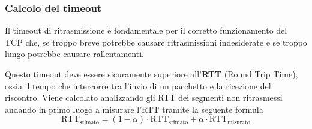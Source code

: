 \subsubsection{Calcolo del timeout}
Il timeout di ritrasmissione è fondamentale per il corretto funzionamento del TCP che, se troppo
breve potrebbe causare ritrasmissioni indesiderate e se troppo lungo potrebbe causare
rallentamenti.

Questo timeout deve essere sicuramente superiore all'\textbf{RTT} (Round Trip Time), ossia il
tempo che intercorre tra l'invio di un pacchetto e la ricezione del riscontro. Viene calcolato
analizzando gli RTT dei segmenti non ritrasmessi andando in primo luogo a misurare l'RTT tramite 
la seguente formula
\[
	\text{RTT}_\text{stimato} = (1 - \alpha) \cdot \text{RTT}_\text{stimato} +
	\alpha \cdot \text{RTT}_\text{misurato}
\]

